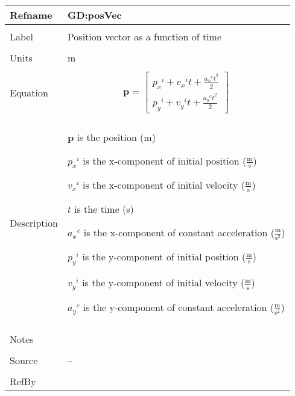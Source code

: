 \documentclass[12pt]{article}
\begin{document}
\noindent \begin{minipage}{\textwidth}
\begin{tabular}{p{} p{}}
\toprule \textbf{Refname} & \textbf{GD:posVec}
\label{GD:posVec}
\\ \midrule \\
Label & Position vector as a function of time
\\ \midrule \\
Units & m
\\ \midrule \\
Equation & \begin{displaymath}
           \mathbf{p}=\begin{bmatrix}
{{p_{x}}^{i}}+{{v_{x}}^{i}} t+\frac{{{a_{x}}^{c}} t^{2}}{2}\\
{{p_{y}}^{i}}+{{v_{y}}^{i}} t+\frac{{{a_{y}}^{c}} t^{2}}{2}
\end{bmatrix}
           \end{displaymath}
\\ \midrule \\
Description & \begin{symbDescription}
              \item{$\mathbf{p}$ is the position (m)}
              \item{${{p_{x}}^{i}}$ is the x-component of initial position ($\frac{\text{m}}{\text{s}}$)}
              \item{${{v_{x}}^{i}}$ is the x-component of initial velocity ($\frac{\text{m}}{\text{s}}$)}
              \item{$t$ is the time (s)}
              \item{${{a_{x}}^{c}}$ is the x-component of constant acceleration ($\frac{\text{m}}{\text{s}^{2}}$)}
              \item{${{p_{y}}^{i}}$ is the y-component of initial position ($\frac{\text{m}}{\text{s}}$)}
              \item{${{v_{y}}^{i}}$ is the y-component of initial velocity ($\frac{\text{m}}{\text{s}}$)}
              \item{${{a_{y}}^{c}}$ is the y-component of constant acceleration ($\frac{\text{m}}{\text{s}^{2}}$)}
              \end{symbDescription}
\\ \midrule \\
Notes & 
\\ \midrule \\
Source & --
\\ \midrule \\
RefBy & 
\\ \bottomrule \end{tabular}
\end{minipage}
\end{document}
